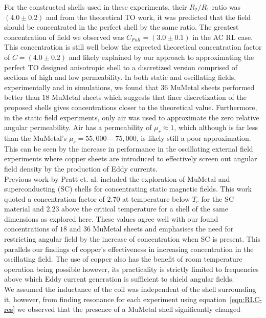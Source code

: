 \documentclass[11pt]{iopart}
\begin{document}
For the constructed shells used in these experiments, their $R_2/R_1$
ratio was $(4.0\pm0.2)$ and from the theoretical TO work, it was
predicted that the field should be concentrated in the perfect shell
by the same ratio. The greatest concentration of field we observed was
$C_{Full} = (3.0\pm0.1)$ in the AC RL case. This concentration is
still well below the expected theoretical concentration factor of $C = (4.0
\pm 0.2)$ and likely explained by our approach to approximating the
perfect TO designed anisotropic shell to a discretized version
comprised of sections of high and low permeability.  In both static
and oscillating fields, experimentally and in simulations, we found
that $36$ MuMetal sheets performed better than $18$ MuMetal sheets
which suggests that finer discretization of the proposed shells gives
concentrations closer to the theoretical value. Furthermore, in the
static field experiments, only air was used to approximate the zero
relative angular permeability. Air has a permeability of $\mu_r
\approx 1$, which although is far less than the MuMetal's $\mu_r =
55,000-75,000 $, is likely still a poor approximation. This can be
seen by the increase in performance in the oscillating external field
experiments where copper sheets are introduced to effectively
screen out angular field density by the production of Eddy
currents. \\
Previous work by Pratt et. al.\cite{N2014} included the exploration of
MuMetal and superconducting (SC) shells for concentrating static
magnetic fields. This work quoted a concentration factor of $2.70$ at
temperature below $T_c$ for the SC material and $2.23$ above the
critical temperature for a shell of the same dimensions as explored
here. These values agree well with our found concentrations of $18$
and $36$ MuMetal sheets and emphasises the need for restricting angular
field by the increase of concentration when SC is present. This
parallels our findings of copper's effectiveness in increasing
concentration in the oscillating field. The use of copper also has the
benefit of room temperature operation being possible however, its
practicality is strictly limited to frequencies above which Eddy
current generation is sufficient to shield angular fields. \\
We assumed the inductance of the coil was independent of the shell
surrounding it, however, from finding resonance for each experiment
using equation~\ref{eqn:RLC-res} we
observed that the presence of a MuMetal shell significantly changed
\end{document}
